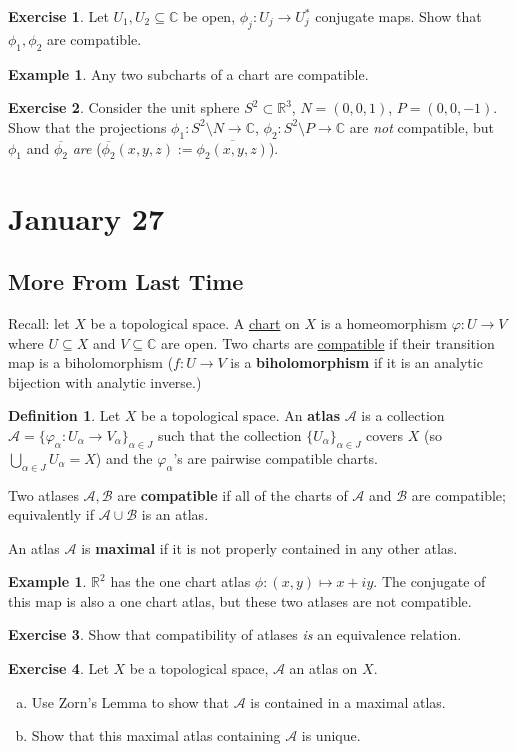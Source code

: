 \documentclass[12pt]{article}
\newcommand{\cx}{\mathbb{C}}
\newcommand{\real}{\mathbb{R}}
\newcommand{\ita}[1]{\textit{#1}}
\theoremstyle{definition}
\newtheorem{definition}[theorem]{Definition}
\newtheorem{example}[theorem]{Example}
\newtheorem{exercise}{Exercise}
\theoremstyle{remark}
\begin{document}
\begin{exercise}
    Let $U_1,U_2\subseteq\cx$ be open, $\phi_j:U_j\to U_j^*$ conjugate maps. Show that $\phi_1,\phi_2$ are compatible.
\end{exercise}
\begin{example}
    Any two subcharts of a chart are compatible.
\end{example}
\begin{exercise}
    Consider the unit sphere $S^2\subset\real^3$, $N=(0,0,1)$, $P=(0,0,-1)$. Show that the projections $\phi_1:S^2\setminus N\to\cx$, $\phi_2:S^2\setminus P\to\cx$ are \ita{not} compatible, but $\phi_1$ and $\overline{\phi_2}$ \ita{are} ($\overline{\phi_2}(x,y,z):=\overline{\phi_2(x,y,z)}$).
\end{exercise}
\section{January 27}
\subsection{More From Last Time}
Recall: let $X$ be a topological space. A \underline{chart} on $X$ is a homeomorphism $\varphi:U\to V$ where $U\subseteq X$ and $V\subseteq\cx$ are open. Two charts are \underline{compatible} if their transition map is a biholomorphism ($f:U\to V$ is a \textbf{biholomorphism} if it is an analytic bijection with analytic inverse.)
\begin{definition}
    Let $X$ be a topological space. An \textbf{atlas} $\mathcal{A}$ is a collection $\mathcal{A}=\{\varphi_{\alpha}:U_{\alpha}\to V_{\alpha}\}_{\alpha\in J}$ such that the collection $\{U_{\alpha}\}_{\alpha\in J}$ covers $X$ (so $\bigcup\limits_{\alpha\in J}U_{\alpha}=X$) and the $\varphi_{\alpha}$'s are pairwise compatible charts.
    
    Two atlases $\mathcal{A},\mathcal{B}$ are \textbf{compatible} if all of the charts of $\mathcal{A}$ and $\mathcal{B}$ are compatible; equivalently if $\mathcal{A}\cup\mathcal{B}$ is an atlas.
    
    An atlas $\mathcal{A}$ is \textbf{maximal} if it is not properly contained in any other atlas.
\end{definition}
\begin{example}
    $\real^2$ has the one chart atlas $\phi:(x,y)\mapsto x+iy$. The conjugate of this map is also a one chart atlas, but these two atlases are not compatible.
\end{example}
\begin{exercise}
    Show that compatibility of atlases \ita{is} an equivalence relation.
\end{exercise}
\begin{exercise}
    Let $X$ be a topological space, $\mathcal{A}$ an atlas on $X$.
    \begin{enumerate}[(a)]
        \item Use Zorn's Lemma to show that $\mathcal{A}$ is contained in a maximal atlas.
        \item Show that this maximal atlas containing $\mathcal{A}$ is unique.
    \end{enumerate}
\end{exercise}
\end{document}
